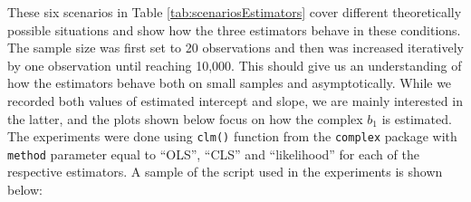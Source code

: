 \documentclass[
]{book}
\begin{document}
\begin{table}

\caption{\label{tab:scenariosEstimators}Several scenarios for the comparison of estimators.}
\centering
{}
\end{table}

These six scenarios in Table \ref{tab:scenariosEstimators} cover different theoretically possible situations and show how the three estimators behave in these conditions. The sample size was first set to 20 observations and then was increased iteratively by one observation until reaching 10,000. This should give us an understanding of how the estimators behave both on small samples and asymptotically. While we recorded both values of estimated intercept and slope, we are mainly interested in the latter, and the plots shown below focus on how the complex \(b_1\) is estimated. The experiments were done using \texttt{clm()} function from the \texttt{complex} package with \texttt{method} parameter equal to ``OLS'', ``CLS'' and ``likelihood'' for each of the respective estimators. A sample of the script used in the experiments is shown below:
\end{document}

